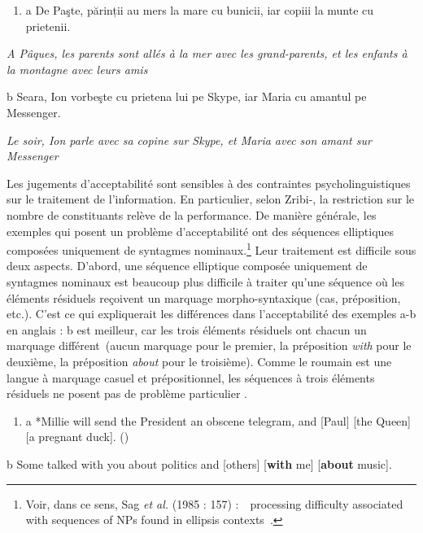 \begin{enumerate}
\item \label{bkm:Ref289338286}a  De Paşte, părinții au mers la mare cu bunicii, iar copiii la munte cu prietenii.


\end{enumerate}
{\itshape
A Pâques, les parents sont allés à la mer avec les grand-parents, et les enfants à la montagne avec leurs amis}

  b  Seara, Ion vorbeşte cu prietena lui pe Skype, iar Maria cu amantul pe Messenger.

    \textit{Le soir, Ion parle avec sa copine sur Skype, et Maria avec son amant sur Messenger} 

Les jugements d'acceptabilité sont sensibles à des contraintes psycholinguistiques sur le traitement de l'information. En particulier, selon Zribi-\citet{Hertz1986}, la restriction sur le nombre de constituants relève de la performance. De manière générale, les exemples qui posent un problème d'acceptabilité ont des séquences elliptiques composées uniquement de syntagmes nominaux.\footnote{Voir, dans ce sens, Sag \textit{et al.} (1985 : 157) :~{\guillemotleft}~processing difficulty associated with sequences of NPs found in ellipsis contexts~{\guillemotright}.} Leur traitement est difficile sous deux aspects. D'abord, une séquence elliptique composée uniquement de syntagmes nominaux est beaucoup plus difficile à traiter qu'une séquence où les éléments résiduels reçoivent un marquage morpho-syntaxique (cas, préposition, etc.). C'est ce qui expliquerait les différences dans l'acceptabilité des exemples a-b en anglais : b est meilleur, car les trois éléments résiduels ont chacun un marquage différent~(aucun marquage pour le premier, la préposition \textit{with} pour le deuxième, la préposition\textit{ about} pour le troisième). Comme le roumain est une langue à marquage casuel et prépositionnel, les séquences à trois éléments résiduels ne posent pas de problème particulier . 


\begin{enumerate}
\item \label{bkm:Ref289336107}a   *Millie will send the President an obscene telegram, and [Paul] [the Queen] [a pregnant duck].              (\citet[25]{Jackendoff1971})


\end{enumerate}
  b  Some talked with you about politics and [others] [\textbf{with} me] [\textbf{about} music].

